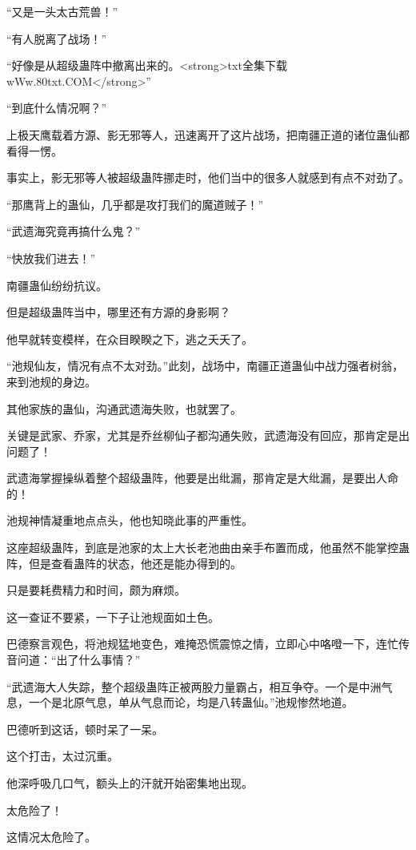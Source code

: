 
\begin{this_body}

“又是一头太古荒兽！”

“有人脱离了战场！”

“好像是从超级蛊阵中撤离出来的。<strong>txt全集下载wWw.80txt.COM</strong>”

“到底什么情况啊？”

上极天鹰载着方源、影无邪等人，迅速离开了这片战场，把南疆正道的诸位蛊仙都看得一愣。

事实上，影无邪等人被超级蛊阵挪走时，他们当中的很多人就感到有点不对劲了。

“那鹰背上的蛊仙，几乎都是攻打我们的魔道贼子！”

“武遗海究竟再搞什么鬼？”

“快放我们进去！”

南疆蛊仙纷纷抗议。

但是超级蛊阵当中，哪里还有方源的身影啊？

他早就转变模样，在众目睽睽之下，逃之夭夭了。

“池规仙友，情况有点不太对劲。”此刻，战场中，南疆正道蛊仙中战力强者树翁，来到池规的身边。

其他家族的蛊仙，沟通武遗海失败，也就罢了。

关键是武家、乔家，尤其是乔丝柳仙子都沟通失败，武遗海没有回应，那肯定是出问题了！

武遗海掌握操纵着整个超级蛊阵，他要是出纰漏，那肯定是大纰漏，是要出人命的！

池规神情凝重地点点头，他也知晓此事的严重性。

这座超级蛊阵，到底是池家的太上大长老池曲由亲手布置而成，他虽然不能掌控蛊阵，但是查看蛊阵的状态，他还是能办得到的。

只是要耗费精力和时间，颇为麻烦。

这一查证不要紧，一下子让池规面如土色。

巴德察言观色，将池规猛地变色，难掩恐慌震惊之情，立即心中咯噔一下，连忙传音问道：“出了什么事情？”

“武遗海大人失踪，整个超级蛊阵正被两股力量霸占，相互争夺。一个是中洲气息，一个是北原气息，单从气息而论，均是八转蛊仙。”池规惨然地道。

巴德听到这话，顿时呆了一呆。

这个打击，太过沉重。

他深呼吸几口气，额头上的汗就开始密集地出现。

太危险了！

这情况太危险了。


\end{this_body}
